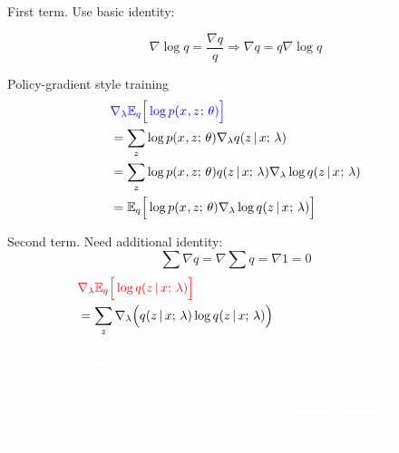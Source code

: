 \begin{frame}
First term. Use basic identity:

\[\nabla \log q = \frac{\nabla q}{q} \Rightarrow \nabla q  = q \nabla \log q \]

Policy-gradient style training \citep{Williams1992}
\begin{align*}
&{\color{blue} \nabla_\lambda {\mathbb{E}_{ q}\Big[ \log p(x^{}, z^{} ; \,\theta) \Big]}}\\
    &=  \sum_z  \log p(x^{}, z ; \, \theta) \nabla_\lambda   q(z \,|\, x ; \, \lambda )  \\ 
        &=  \sum_z  \log p(x^{}, z ; \, \theta)  q(z \,|\, x ; \, \lambda )  \nabla_\lambda \log q(z \,|\, x^{} ; \, \lambda)  \\ 
    &= \mathbb{E}_{q}\Big[ \log p(x^{}, z ; \, \theta) \nabla_\lambda \log q(z \,|\, x^{} ; \, \lambda) \Big]
\end{align*}
\end{frame}


\begin{frame}
Second term. Need additional identity:
\[\sum \nabla q = \nabla \sum q = \nabla 1 = 0 \]
\vspace{-5mm}
\begin{align*}
    &{\color{red} \nabla_\lambda  \E_{q}\Big[\log q(z \given x \param \lambda) \Big] }\\
    &= \sum_{z} \nabla_\lambda \Big ( q(z \given x\param \lambda) \log q(z \given x \param \lambda)\Big) \\
    &{\color{white} = \sum_{z}  \log q(z \given x \param \lambda) \nabla_\lambda q(z \given x \param \lambda) +  \frac{q(z \given x \param \lambda)}{q(z \given x \param \lambda)}\nabla_\lambda q(z \given x \param \lambda) }\\
    &{\color{white}= \sum_{z}  \log q(z \given x \param \lambda) \nabla_\lambda \log q(z \given x \param \lambda) + \underbrace{\sum_z \nabla_\lambda q(z \given x \param \lambda)}_{= 0}} \\
    &{\color{white}= \E_{q}[\log q (z \given x \param \lambda) \nabla_\lambda q (z \given x \param \lambda)]}
\end{align*}
\end{frame}

